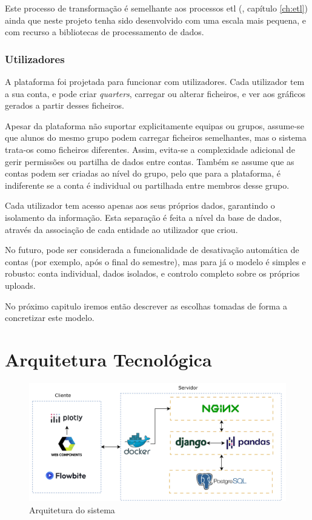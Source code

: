 Este processo de transformação é semelhante aos processos \gls{etl} (\cf, capítulo \ref{ch:etl}) ainda que neste projeto tenha sido desenvolvido com uma escala mais pequena, e com recurso a bibliotecas de processamento de dados.

\subsubsection{Utilizadores}

A plataforma foi projetada para funcionar com utilizadores. Cada utilizador tem a sua conta, e pode criar \textit{quarters}, carregar ou alterar ficheiros, e ver aos gráficos gerados a partir desses ficheiros.

Apesar da plataforma não suportar explicitamente equipas ou grupos, assume-se que alunos do mesmo grupo podem carregar ficheiros semelhantes, mas o sistema trata-os como ficheiros diferentes. Assim, evita-se a complexidade adicional de gerir permissões ou partilha de dados entre contas. Também se assume que as contas podem ser criadas ao nível do grupo, pelo que para a plataforma, é indiferente se a conta é individual ou partilhada entre membros desse grupo.

Cada utilizador tem acesso apenas aos seus próprios dados, garantindo o isolamento da informação. Esta separação é feita a nível da base de dados, através da associação de cada entidade ao utilizador que criou.

No futuro, pode ser considerada a funcionalidade de desativação automática de contas (por exemplo, após o final do semestre), mas para já o modelo é simples e robusto: conta individual, dados isolados, e controlo completo sobre os próprios uploads.

No próximo capitulo iremos então descrever as escolhas tomadas de forma a concretizar este modelo.

\section{Arquitetura Tecnológica}
\label{sec:tec}

\begin{figure}[h]
\centering
\includegraphics[max width=\textwidth]{./img/arch}
\caption{Arquitetura do sistema}
\label{fig:arquitectura}
\end{figure}

